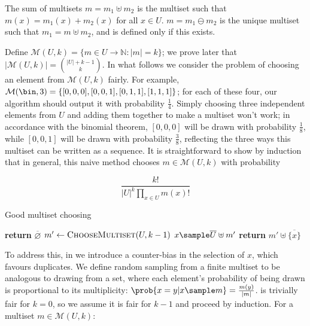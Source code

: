 \documentclass[letterpaper,luatex,11pt]{article}
\begin{document}
The sum of multisets
$m = m_1 \uplus m_2$ is the multiset such that $m(x) = m_1(x) + m_2(x)$ for all $x \in U$.
$m =m_1 \ominus m_2$ is the unique multiset such that $m_1 = m \uplus m_2$,
and is defined only if this exists.

Define $\mathcal{M}(U, k) = \{m \in U \rightarrow \mathbb{N}: |m| = k\}$; we prove later that
$|\mathcal{M}(U, k)| = \binom{|U| + k - 1}{k}$.
In what follows we consider the problem of choosing an element from $\mathcal{M}(U, k)$ fairly.
For example, $\mathcal{M}(\bin, 3) = \{[0, 0, 0], [0, 0, 1], [0, 1, 1], [1, 1, 1]\}$; for each of
these four, our algorithm should output it with probability $\frac{1}{4}$. Simply choosing three
independent elements from $U$ and adding them together to make a multiset won't work; in accordance
with the binomial theorem, $[0, 0, 0]$ will be drawn with probability $\frac{1}{8}$, while
$[0, 0, 1]$ will be drawn with probability $\frac{3}{8}$, reflecting the three ways this multiset
can be written as a sequence. It is straightforward to show by
induction that in general, this naive method chooses $m \in \mathcal{M}(U, k)$
with probability

\begin{displaymath}
    \frac{k!}{{|U|}^k \prod_{x \in U} m(x)!}
\end{displaymath}

\begin{algorithm}
\caption{Good multiset choosing}
\begin{algorithmic}[0]
        \State \textbf{return} $\overline{\varnothing}$
    \Else
        \State $m' \leftarrow \textproc{ChooseMultiset}(U, k-1)$
        \State $x \sample \overline{U} \uplus m'$
        \State \textbf{return} $m' \uplus \overline{\{x\}}$
    \EndIf
\EndProcedure
\end{algorithmic}
\end{algorithm}

To address this, in 
we introduce a counter-bias in the selection of $x$, which favours duplicates.
We define random sampling from a finite multiset to be analogous to drawing from a set,
where each element's probability of being drawn is proportional to its multiplicity:
$\prob{x = y |x \sample m} = \frac{m(y)}{|m|}$.
 is trivially fair for $k = 0$, so
we assume it is fair for $k - 1$ and proceed by induction.
For a multiset $m \in \mathcal{M}(U, k)$:
\end{document}
